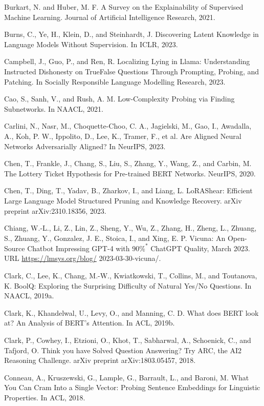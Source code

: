 \documentclass[10pt]{article}
\begin{document}
Burkart, N. and Huber, M. F. A Survey on the Explainability of Supervised Machine Learning. Journal of Artificial Intelligence Research, 2021.

Burns, C., Ye, H., Klein, D., and Steinhardt, J. Discovering Latent Knowledge in Language Models Without Supervision. In ICLR, 2023.

Campbell, J., Guo, P., and Ren, R. Localizing Lying in Llama: Understanding Instructed Dishonesty on TrueFalse Questions Through Prompting, Probing, and Patching. In Socially Responsible Language Modelling Research, 2023.

Cao, S., Sanh, V., and Rush, A. M. Low-Complexity Probing via Finding Subnetworks. In NAACL, 2021.

Carlini, N., Nasr, M., Choquette-Choo, C. A., Jagielski, M., Gao, I., Awadalla, A., Koh, P. W., Ippolito, D., Lee, K., Tramer, F., et al. Are Aligned Neural Networks Adversarially Aligned? In NeurIPS, 2023.

Chen, T., Frankle, J., Chang, S., Liu, S., Zhang, Y., Wang, Z., and Carbin, M. The Lottery Ticket Hypothesis for Pre-trained BERT Networks. NeurIPS, 2020.

Chen, T., Ding, T., Yadav, B., Zharkov, I., and Liang, L. LoRAShear: Efficient Large Language Model Structured Pruning and Knowledge Recovery. arXiv preprint arXiv:2310.18356, 2023.

Chiang, W.-L., Li, Z., Lin, Z., Sheng, Y., Wu, Z., Zhang, H., Zheng, L., Zhuang, S., Zhuang, Y., Gonzalez, J. E., Stoica, I., and Xing, E. P. Vicuna: An Open-Source Chatbot Impressing GPT-4 with $90 \%^{*}$ ChatGPT Quality, March 2023. URL \href{https://lmsys.org/blog/}{https://lmsys.org/blog/} 2023-03-30-vicuna/.

Clark, C., Lee, K., Chang, M.-W., Kwiatkowski, T., Collins, M., and Toutanova, K. BoolQ: Exploring the Surprising Difficulty of Natural Yes/No Questions. In NAACL, 2019a.

Clark, K., Khandelwal, U., Levy, O., and Manning, C. D. What does BERT look at? An Analysis of BERT's Attention. In ACL, 2019b.

Clark, P., Cowhey, I., Etzioni, O., Khot, T., Sabharwal, A., Schoenick, C., and Tafjord, O. Think you have Solved Question Answering? Try ARC, the AI2 Reasoning Challenge. arXiv preprint arXiv:1803.05457, 2018.

Conneau, A., Kruszewski, G., Lample, G., Barrault, L., and Baroni, M. What You Can Cram Into a Single Vector: Probing Sentence Embeddings for Linguistic Properties. In ACL, 2018.
\end{document}
